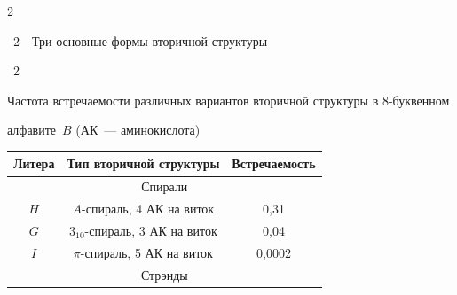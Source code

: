 \begin{multicols}{2}
\begin{center}
\end{center}

\vspace*{4pt}

\begin{center}

{{\figurename~2}\ \ \small{Три основные формы вторичной структуры}}

\end{center}

\vspace*{9pt}






\addtocounter{figure}{1}



\noindent

{{\tablename~2}\ \ \small{Частота встречаемости различных вариантов вторичной структуры в 8-бук\-вен\-ном 

алфавите~$B$ (АК~--- аминокислота)}}


\vspace*{2pt}



{\small

\begin{center}

\tabcolsep=5pt

\begin{tabular}{|c|c|c|}

\hline

Литера&Тип вторичной структуры&Встречаемость\\

\hline

\multicolumn{3}{|c|}{Спирали}\\

\hline

$H$&$A$-спираль, 4 АК на виток&0,31\\

\hline

$G$&3$_{10}$-спираль, 3 АК на виток&0,04\\

\hline

$I$&$\pi$-спираль, 5 АК на виток&\hphantom{99}0,0002\\

\hline

\multicolumn{3}{|c|}{Стрэнды}\\


\end{tabular}
\end{center}}
\end{multicols}
